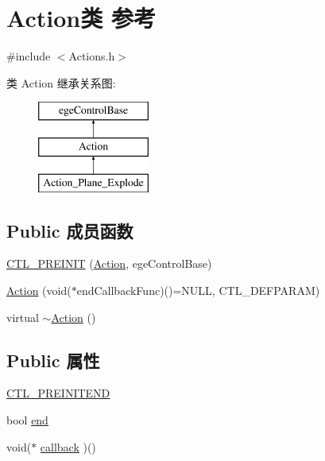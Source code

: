 \hypertarget{class_action}{}\section{Action类 参考}
\label{class_action}


{\ttfamily \#include $<$Actions.\+h$>$}

类 Action 继承关系图\+:\begin{figure}[H]
\begin{center}
\leavevmode
\includegraphics[height=3.000000cm]{class_action}
\end{center}
\end{figure}
\subsection*{Public 成员函数}
\begin{DoxyCompactItemize}
\item 
\hyperlink{class_action_a4d1309da871dfc1da7b4bdc896e34c0e}{C\+T\+L\+\_\+\+P\+R\+E\+I\+N\+IT} (\hyperlink{class_action}{Action}, ege\+Control\+Base)
\item 
\hyperlink{class_action_a656f4ac0205bbd055dd360248786475a}{Action} (void($\ast$end\+Callback\+Func)()=N\+U\+LL, C\+T\+L\+\_\+\+D\+E\+F\+P\+A\+R\+AM)
\item 
virtual \hyperlink{class_action_abcf4c6358f53a666631ace11b325a7cd}{$\sim$\+Action} ()
\end{DoxyCompactItemize}
\subsection*{Public 属性}
\begin{DoxyCompactItemize}
\item 
\hyperlink{class_action_a682e7ba0a9ef3f891382df776c1ce883}{C\+T\+L\+\_\+\+P\+R\+E\+I\+N\+I\+T\+E\+ND}
\item 
bool \hyperlink{class_action_a28332e6535d45661d768bb1b321f4715}{end}
\item 
void($\ast$ \hyperlink{class_action_aef6c7c00b09ea1b0ddd7a26926309717}{callback} )()
\end{DoxyCompactItemize}


